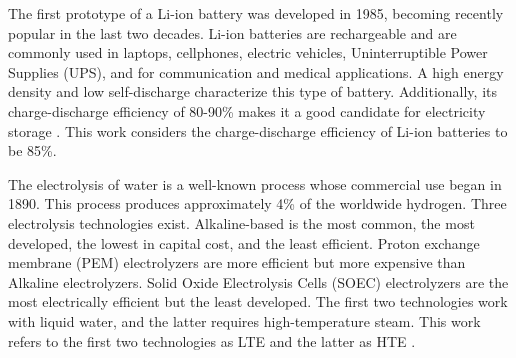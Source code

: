 \documentclass{anstrans}
\begin{document}
The first prototype of a Li-ion battery was developed in 1985, becoming recently popular in the last two decades.
Li-ion batteries are rechargeable and are commonly used in laptops, cellphones, electric vehicles, Uninterruptible Power Supplies (UPS), and for communication and medical applications.
A high energy density and low self-discharge characterize this type of battery.
Additionally, its charge-discharge efficiency of 80-90\% makes it a good candidate for electricity storage \cite{sun_car_2010}.
This work considers the charge-discharge efficiency of Li-ion batteries to be 85\%.

The electrolysis of water is a well-known process whose commercial use began in 1890.
This process produces approximately 4\% of the worldwide hydrogen.
Three electrolysis technologies exist.
Alkaline-based is the most common, the most developed, the lowest in capital cost, and the least efficient.
Proton exchange membrane (PEM) electrolyzers are more efficient but more expensive than Alkaline electrolyzers.
Solid Oxide Electrolysis Cells (SOEC) electrolyzers are the most electrically efficient but the least developed.
The first two technologies work with liquid water, and the latter requires high-temperature steam.
This work refers to the first two technologies as \gls{LTE} and the latter as \gls{HTE} \cite{fairhurst-agosta_multi-physics_2020}.
\end{document}
